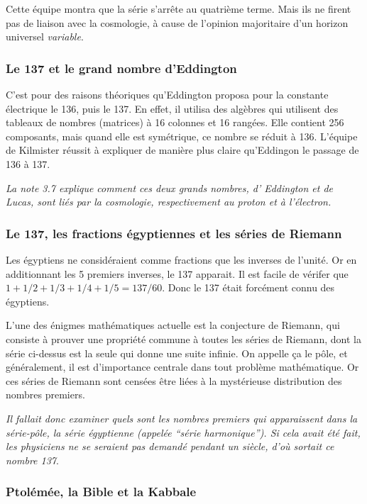 \documentclass[a4paper,12pt]{article}
\begin{document}
Cette équipe montra que la série s'arrête au quatrième terme. Mais ils ne firent pas de liaison avec la cosmologie, à cause de l'opinion majoritaire d'un horizon universel \textit{variable}. 


\subsubsection{Le 137 et le grand nombre d'Eddington}

     C'est pour des raisons théoriques qu'Eddington proposa pour la constante électrique le 136, puis le 137. En effet, il utilisa des algèbres qui utilisent des tableaux de nombres (matrices) à 16 colonnes et 16 rangées. Elle contient 256 composants, mais quand elle est symétrique, ce nombre se réduit à 136. L'équipe de Kilmister réussit à expliquer de manière plus claire qu'Eddingon le passage de 136 à 137.

      \textit{ La note 3.7 explique comment ces deux grands nombres, d' Eddington et de Lucas, sont liés par la cosmologie, respectivement au proton et à l'électron.}


\subsubsection{Le 137, les fractions égyptiennes et les séries de Riemann}
  
       Les égyptiens ne considéraient comme fractions que les inverses de l'unité. Or en additionnant les 5 premiers inverses, le 137 apparait. Il est facile de vérifer que $1+1/2+1/3+1/4+1/5 = 137/60$. Donc le 137 était forcément connu des égyptiens.

L'une des énigmes mathématiques actuelle est la conjecture de Riemann, qui consiste à prouver une propriété commune à toutes les séries de Riemann, dont la série ci-dessus est la seule qui donne une suite infinie. On appelle ça le pôle, et généralement, il est d'importance centrale dans tout problème mathématique. Or ces séries de Riemann sont censées être liées à la mystérieuse distribution des nombres premiers. 


\textit{Il fallait donc examiner quels sont les nombres premiers qui apparaissent dans la série-pôle, la série égyptienne (appelée ``série harmonique''). Si cela avait été fait, les physiciens ne se seraient pas demandé pendant un siècle, d'où sortait ce nombre 137}.


\subsubsection{Ptolémée, la Bible et la Kabbale}
\end{document}
